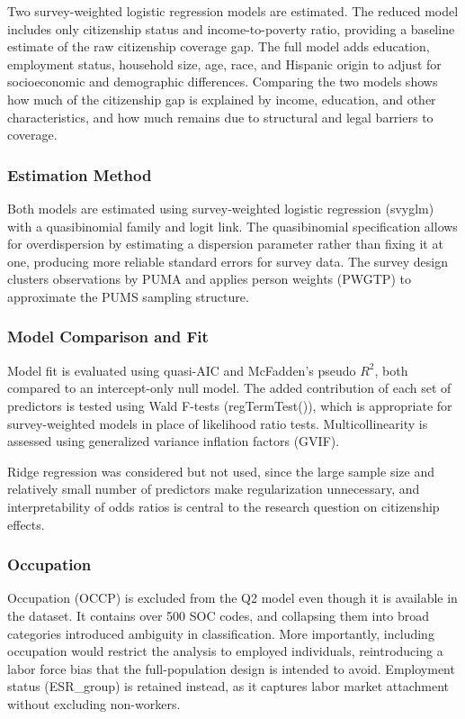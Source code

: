 \documentclass[
  letterpaper,
  DIV=11,
  numbers=noendperiod]{scrartcl}
\begin{document}
Two survey-weighted logistic regression models are estimated. The
reduced model includes only citizenship status and income-to-poverty
ratio, providing a baseline estimate of the raw citizenship coverage
gap. The full model adds education, employment status, household size,
age, race, and Hispanic origin to adjust for socioeconomic and
demographic differences. Comparing the two models shows how much of the
citizenship gap is explained by income, education, and other
characteristics, and how much remains due to structural and legal
barriers to coverage.

\subsubsection{Estimation Method}\label{estimation-method}

Both models are estimated using survey-weighted logistic regression
(svyglm) with a quasibinomial family and logit link. The quasibinomial
specification allows for overdispersion by estimating a dispersion
parameter rather than fixing it at one, producing more reliable standard
errors for survey data. The survey design clusters observations by PUMA
and applies person weights (PWGTP) to approximate the PUMS sampling
structure.

\subsubsection{Model Comparison and Fit}\label{model-comparison-and-fit}

Model fit is evaluated using quasi-AIC and McFadden's pseudo \(R^2\),
both compared to an intercept-only null model. The added contribution of
each set of predictors is tested using Wald F-tests (regTermTest()),
which is appropriate for survey-weighted models in place of likelihood
ratio tests. Multicollinearity is assessed using generalized variance
inflation factors (GVIF).

Ridge regression was considered but not used, since the large sample
size and relatively small number of predictors make regularization
unnecessary, and interpretability of odds ratios is central to the
research question on citizenship effects.

\subsubsection{Occupation}\label{occupation}

Occupation (OCCP) is excluded from the Q2 model even though it is
available in the dataset. It contains over 500 SOC codes, and collapsing
them into broad categories introduced ambiguity in classification. More
importantly, including occupation would restrict the analysis to
employed individuals, reintroducing a labor force bias that the
full-population design is intended to avoid. Employment status
(ESR\_group) is retained instead, as it captures labor market attachment
without excluding non-workers.
\end{document}
